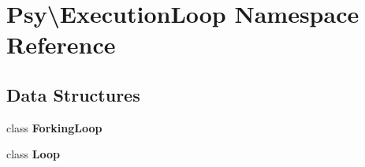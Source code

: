 \section{Psy\textbackslash{}Execution\+Loop Namespace Reference}
\label{namespace_psy_1_1_execution_loop}
\subsection*{Data Structures}
\begin{DoxyCompactItemize}
\item 
class {\bf Forking\+Loop}
\item 
class {\bf Loop}
\end{DoxyCompactItemize}
